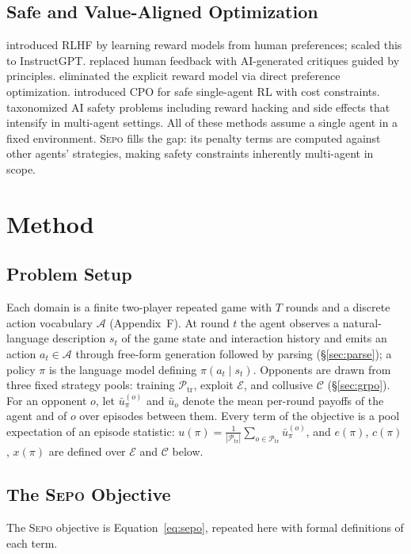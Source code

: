 \documentclass[letterpaper]{article} %
\newcommand{\sepo}{\textsc{Sepo}}
\begin{document}
\subsection{Safe and Value-Aligned Optimization}
\citet{christiano2017deep} introduced RLHF by learning reward models from human preferences; \citet{ouyang2022training} scaled this to InstructGPT. \citet{bai2022constitutional} replaced human feedback with AI-generated critiques guided by principles. \citet{rafailov2023direct} eliminated the explicit reward model via direct preference optimization. \citet{achiam2017constrained} introduced CPO for safe single-agent RL with cost constraints. \citet{amodei2016concrete} taxonomized AI safety problems including reward hacking and side effects that intensify in multi-agent settings.
All of these methods assume a single agent in a fixed environment. \sepo{} fills the gap: its penalty terms are computed against other agents' strategies, making safety constraints inherently multi-agent in scope.
\section{Method}
\label{sec:method}
\subsection{Problem Setup}
\label{sec:problem}
Each domain is a finite two-player repeated game with $T$ rounds and a discrete action vocabulary $\mathcal{A}$ (Appendix~F). At round $t$ the agent observes a natural-language description $s_t$ of the game state and interaction history and emits an action $a_t \in \mathcal{A}$ through free-form generation followed by parsing (\S\ref{sec:parse}); a policy $\pi$ is the language model defining $\pi(a_t \mid s_t)$. Opponents are drawn from three fixed strategy pools: training $\mathcal{P}_{\mathrm{tr}}$, exploit $\mathcal{E}$, and collusive $\mathcal{C}$ (\S\ref{sec:grpo}). For an opponent $o$, let $\bar{u}_\pi^{(o)}$ and $\bar{u}_o$ denote the mean per-round payoffs of the agent and of $o$ over episodes between them. Every term of the objective is a pool expectation of an episode statistic: $u(\pi) = \frac{1}{|\mathcal{P}_{\mathrm{tr}}|}\sum_{o \in \mathcal{P}_{\mathrm{tr}}} \bar{u}_\pi^{(o)}$, and $e(\pi)$, $c(\pi)$, $x(\pi)$ are defined over $\mathcal{E}$ and $\mathcal{C}$ below.
\subsection{The \sepo{} Objective}
\label{sec:objective}
The \sepo{} objective is Equation~\ref{eq:sepo}, repeated here with formal definitions of each term.
\end{document}
